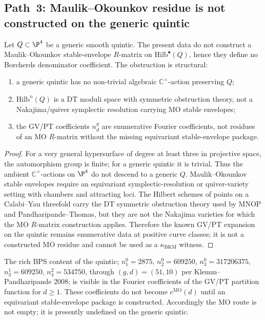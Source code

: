 \subsection{Path~3: Maulik--Okounkov residue is not constructed on the generic quintic}
\label{subsec:quintic-path-3-mo}

\begin{theorem}
\label{thm:quintic-path-3-mo-scalar}
Let $Q\subset\P^4$ be a generic smooth quintic. The present data do not
construct a Maulik--Okounkov stable-envelope $R$-matrix on
$\mathrm{Hilb}^\bullet(Q)$, hence they define no Borcherds
denominator coefficient. The obstruction is structural:
\begin{enumerate}[label=\textup{(\roman*)}]
 \item a generic quintic has no non-trivial algebraic
 $\mathbb C^\times$-action preserving $Q$;
 \item $\mathrm{Hilb}^n(Q)$ is a DT moduli space with symmetric
 obstruction theory, not a Nakajima/quiver symplectic resolution
 carrying MO stable envelopes;
 \item the GV/PT coefficients $n^g_d$ are enumerative Fourier
 coefficients, not residues of an MO $R$-matrix without the
 missing equivariant stable-envelope package.
\end{enumerate}
\end{theorem}

\begin{proof}
For a very general hypersurface of degree at least three in projective
space, the automorphism group is finite; for a generic quintic it is
trivial. Thus the ambient $\mathbb C^\times$-actions on $\P^4$ do not
descend to a generic $Q$. Maulik--Okounkov stable envelopes require an
equivariant symplectic-resolution or quiver-variety setting with
chambers and attracting loci. The Hilbert schemes of points on a
Calabi--Yau threefold carry the DT symmetric obstruction theory used by
MNOP and Pandharipande--Thomas, but they are not the Nakajima varieties
for which the MO $R$-matrix construction applies. Therefore the known
GV/PT expansion on the quintic remains enumerative data at positive
curve classes; it is not a constructed MO residue and cannot be used
as a $\kappa_{\mathrm{BKM}}$ witness.
\end{proof}

\begin{remark}
\label{rem:quintic-kp-bps-content}
The rich BPS content of the quintic; $n^0_1 = 2875$,
$n^0_2 = 609250$, $n^0_3 = 317206375$, $n^1_3 = 609250$,
$n^2_4 = 534750$, through $(g, d) = (51, 10)$ per
Klemm--Pandharipande 2008; is visible in the Fourier
coefficients of the GV/PT partition function for $d \geq 1$. These
coefficients do not become $c^{\mathrm{MO}}(d)$ until an equivariant
stable-envelope package is constructed. Accordingly the MO route is
not empty; it is presently undefined on the generic quintic.
\end{remark}

